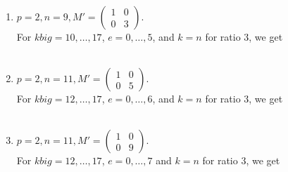 \documentclass[letterpaper,12pt]{article}
\begin{document}
\begin{enumerate}
\item $p=2, n=9, M' = \begin{pmatrix}
1 & 0 \\ 0 & 3
\end{pmatrix}.$ \\
For $kbig = 10, \dots, 17$, $e = 0, \dots, 5$, and $k=n$ for ratio 3, we get \\
 \\

\item $p=2, n=11, M' = \begin{pmatrix}
1 & 0 \\ 0 & 5
\end{pmatrix}.$ \\
For $kbig = 12, \dots, 17$, $e = 0, \dots, 6$, and $k=n$ for ratio 3, we get \\
 \\

\item $p=2, n=11, M' = \begin{pmatrix}
1 & 0 \\ 0 & 9
\end{pmatrix}.$ \\
For $kbig = 12, \dots, 17$, $e = 0, \dots, 7$ and $k=n$ for ratio 3, we get \\
 \\


\end{enumerate}
\end{document}

